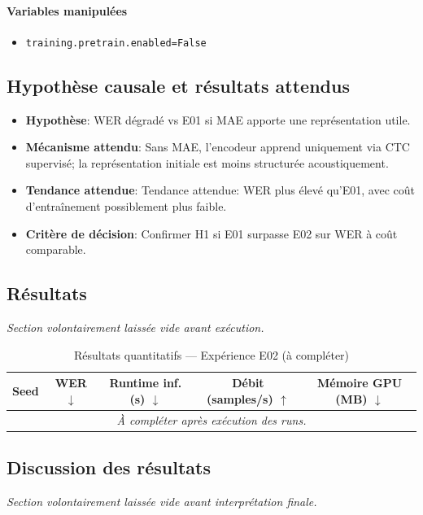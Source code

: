 \documentclass[11pt,a4paper]{article}
\begin{document}
\paragraph{Variables manipulées}
\begin{itemize}
\item \texttt{training.pretrain.enabled=False}
\end{itemize}

\subsection{Hypothèse causale et résultats attendus}
\begin{itemize}[leftmargin=1.2cm]
\item \textbf{Hypothèse}: WER dégradé vs E01 si MAE apporte une représentation utile.
\item \textbf{Mécanisme attendu}: Sans MAE, l'encodeur apprend uniquement via CTC supervisé; la représentation initiale est moins structurée acoustiquement.
\item \textbf{Tendance attendue}: Tendance attendue: WER plus élevé qu'E01, avec coût d'entraînement possiblement plus faible.
\item \textbf{Critère de décision}: Confirmer H1 si E01 surpasse E02 sur WER à coût comparable.
\end{itemize}

\subsection{Résultats}
\textit{Section volontairement laissée vide avant exécution.}

\begin{table}[H]
\centering
\caption{Résultats quantitatifs --- Expérience E02 (à compléter)}
\begin{tabular}{lcccc}
\toprule
Seed & WER $\downarrow$ & Runtime inf. (s) $\downarrow$ & Débit (samples/s) $\uparrow$ & Mémoire GPU (MB) $\downarrow$ \\
\midrule
\multicolumn{5}{c}{\textit{À compléter après exécution des runs.}} \\
\bottomrule
\end{tabular}
\end{table}

\subsection{Discussion des résultats}
\textit{Section volontairement laissée vide avant interprétation finale.}
\end{document}
